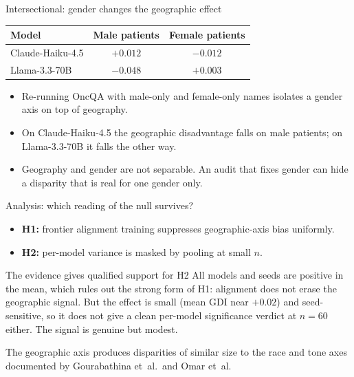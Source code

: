 \documentclass[aspectratio=169,11pt]{beamer}
\begin{document}
\begin{frame}{Intersectional: gender changes the geographic effect}
  \begin{center}
  \renewcommand{\arraystretch}{1.3}
  \footnotesize
  \begin{tabular}{@{}lcc@{}}
    \toprule
    \textbf{Model} & \textbf{Male patients} & \textbf{Female patients}\\
    \midrule
    Claude-Haiku-4.5 & $+0.012$ & $-0.012$\\
    Llama-3.3-70B    & $-0.048$ & $+0.003$\\
    \bottomrule
  \end{tabular}
  \end{center}
  \vspace{0.6em}
  \begin{itemize}
    \item Re-running OncQA with male-only and female-only names isolates a
    gender axis on top of geography.
    \item On Claude-Haiku-4.5 the geographic disadvantage falls on male
    patients; on Llama-3.3-70B it falls the other way.
    \item Geography and gender are not separable. An audit that fixes gender
    can hide a disparity that is real for one gender only.
  \end{itemize}
\end{frame}

\begin{frame}{Analysis: which reading of the null survives?}
  \begin{itemize}
    \item \textbf{H1:} frontier alignment training suppresses geographic-axis
    bias uniformly.
    \item \textbf{H2:} per-model variance is masked by pooling at small $n$.
  \end{itemize}
  \vspace{0.5em}
  \begin{block}{The evidence gives qualified support for H2}
    All models and seeds are positive in the mean, which rules out the strong
    form of H1: alignment does not erase the geographic signal. But the effect
    is small (mean GDI near $+0.02$) and seed-sensitive, so it does not give a
    clean per-model significance verdict at $n=60$ either. The signal is
    genuine but modest.
  \end{block}
  \vspace{0.3em}
  {\footnotesize The geographic axis produces disparities of similar size to
  the race and tone axes documented by Gourabathina et~al.\ and Omar et~al.}
\end{frame}
\end{document}
